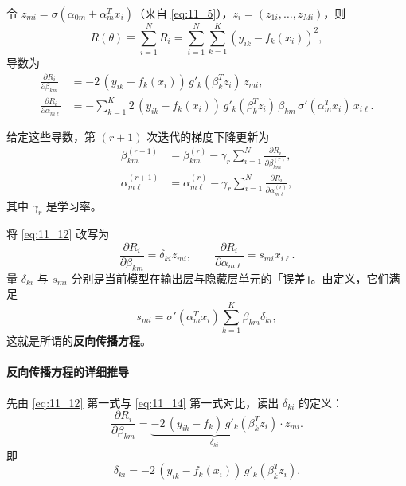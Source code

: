 令 $z_{mi} = \sigma(\alpha_{0m} + \alpha_m^T x_i)$（来自 \ref{eq:11_5}），$z_i = (z_{1i},\dots,z_{Mi})$，则
\begin{equation}
R(\theta) \equiv \sum_{i=1}^{N} R_i = \sum_{i=1}^{N} \sum_{k=1}^{K} \left( y_{ik} - f_k(x_i) \right)^2, \label{eq:11_11}
\end{equation}
导数为
\begin{align}
\frac{\partial R_i}{\partial \beta_{km}} &= -2\,(y_{ik} - f_k(x_i))\, g'_k(\beta_k^T z_i)\, z_{mi}, \nonumber \\
\frac{\partial R_i}{\partial \alpha_{m\ell}} &= - \sum_{k=1}^{K} 2\,(y_{ik} - f_k(x_i))\, g'_k(\beta_k^T z_i)\, \beta_{km}\, \sigma'(\alpha_m^T x_i)\, x_{i\ell}. \label{eq:11_12}
\end{align}

给定这些导数，第 $(r+1)$ 次迭代的梯度下降更新为
\begin{align}
\beta_{km}^{(r+1)} &= \beta_{km}^{(r)} - \gamma_r \sum_{i=1}^{N} \frac{\partial R_i}{\partial \beta_{km}^{(r)}}, \nonumber \\
\alpha_{m\ell}^{(r+1)} &= \alpha_{m\ell}^{(r)} - \gamma_r \sum_{i=1}^{N} \frac{\partial R_i}{\partial \alpha_{m\ell}^{(r)}}, \label{eq:11_13}
\end{align}
其中 $\gamma_r$ 是学习率。

将 \ref{eq:11_12} 改写为
\begin{equation}
\frac{\partial R_i}{\partial \beta_{km}} = \delta_{ki} z_{mi}, \qquad
\frac{\partial R_i}{\partial \alpha_{m\ell}} = s_{mi} x_{i\ell}. \label{eq:11_14}
\end{equation}
量 $\delta_{ki}$ 与 $s_{mi}$ 分别是当前模型在输出层与隐藏层单元的「误差」。由定义，它们满足
\begin{equation}
s_{mi} = \sigma'(\alpha_m^T x_i) \sum_{k=1}^{K} \beta_{km} \delta_{ki}, \label{eq:11_15}
\end{equation}
这就是所谓的\textbf{反向传播方程}。

\paragraph{反向传播方程的详细推导}

先由 \ref{eq:11_12} 第一式与 \ref{eq:11_14} 第一式对比，读出 $\delta_{ki}$ 的定义：
\[
\frac{\partial R_i}{\partial \beta_{km}} = \underbrace{-2\,(y_{ik}-f_k)\, g'_k(\beta_k^T z_i)}_{\delta_{ki}} \cdot z_{mi}.
\]
即
\begin{equation}
\delta_{ki} = -2\,(y_{ik} - f_k(x_i))\, g'_k(\beta_k^T z_i). \label{eq:11_15a}
\end{equation}

